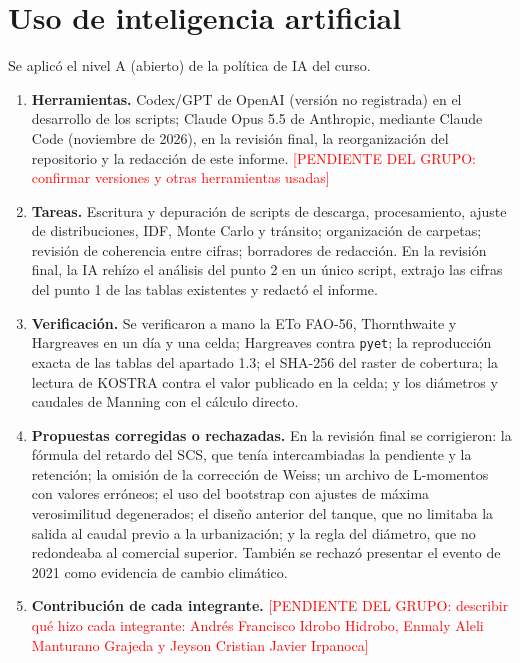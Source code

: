 \documentclass[12pt,a4paper]{article}
\newcommand{\PENDIENTE}[1]{\textcolor{red}{[PENDIENTE DEL GRUPO: #1]}}
\begin{document}
\section{Uso de inteligencia artificial}

Se aplicó el nivel A (abierto) de la política de IA del curso.

\begin{enumerate}
\item \textbf{Herramientas.} Codex/GPT de OpenAI (versión no registrada) en el desarrollo de los scripts; Claude Opus 5.5 de Anthropic, mediante Claude Code (noviembre de 2026), en la revisión final, la reorganización del repositorio y la redacción de este informe. \PENDIENTE{confirmar versiones y otras herramientas usadas}
\item \textbf{Tareas.} Escritura y depuración de scripts de descarga, procesamiento, ajuste de distribuciones, IDF, Monte Carlo y tránsito; organización de carpetas; revisión de coherencia entre cifras; borradores de redacción. En la revisión final, la IA rehízo el análisis del punto 2 en un único script, extrajo las cifras del punto 1 de las tablas existentes y redactó el informe.
\item \textbf{Verificación.} Se verificaron a mano la ETo FAO-56, Thornthwaite y Hargreaves en un día y una celda; Hargreaves contra \texttt{pyet}; la reproducción exacta de las tablas del apartado 1.3; el SHA-256 del raster de cobertura; la lectura de KOSTRA contra el valor publicado en la celda; y los diámetros y caudales de Manning con el cálculo directo.
\item \textbf{Propuestas corregidas o rechazadas.} En la revisión final se corrigieron: la fórmula del retardo del SCS, que tenía intercambiadas la pendiente y la retención; la omisión de la corrección de Weiss; un archivo de L-momentos con valores erróneos; el uso del bootstrap con ajustes de máxima verosimilitud degenerados; el diseño anterior del tanque, que no limitaba la salida al caudal previo a la urbanización; y la regla del diámetro, que no redondeaba al comercial superior. También se rechazó presentar el evento de 2021 como evidencia de cambio climático.
\item \textbf{Contribución de cada integrante.} \PENDIENTE{describir qué hizo cada integrante: Andrés Francisco Idrobo Hidrobo, Enmaly Aleli Manturano Grajeda y Jeyson Cristian Javier Irpanoca}
\end{enumerate}
\end{document}
